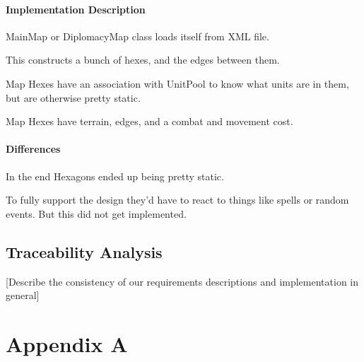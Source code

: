\documentclass[12pt,a4paper,titlepage]{article}
\begin{document}
\paragraph{Implementation Description}
MainMap or DiplomacyMap class loads itself from XML file.

This constructs a bunch of hexes, and the edges between them.

Map Hexes have an association with UnitPool to know what units
are in them, but are otherwise pretty static.

Map Hexes have terrain, edges, and a combat and movement cost.
\paragraph{Differences}
In the end Hexagons ended up being pretty static.

To fully support the design they'd have to
react to things like spells or random events.
But this did not get implemented.

\subsection{Traceability Analysis}
[Describe the consistency of our requirements descriptions and implementation in general]

\section{Appendix A}
\end{document}
